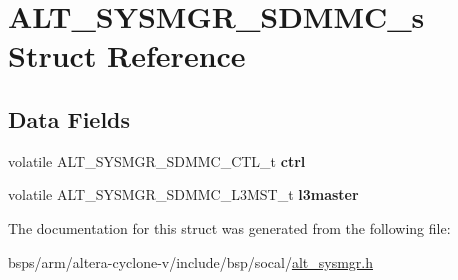 \hypertarget{structALT__SYSMGR__SDMMC__s}{}\section{A\+L\+T\+\_\+\+S\+Y\+S\+M\+G\+R\+\_\+\+S\+D\+M\+M\+C\+\_\+s Struct Reference}
\label{structALT__SYSMGR__SDMMC__s}
\subsection*{Data Fields}
\begin{DoxyCompactItemize}
\item 
\mbox{\label{structALT__SYSMGR__SDMMC__s_a8eb6036618c4d7fcfd26b771fd6a5080}} 
volatile A\+L\+T\+\_\+\+S\+Y\+S\+M\+G\+R\+\_\+\+S\+D\+M\+M\+C\+\_\+\+C\+T\+L\+\_\+t {\bfseries ctrl}
\item 
\mbox{\label{structALT__SYSMGR__SDMMC__s_a30eda050c5755d123460a5aff7b58b84}} 
volatile A\+L\+T\+\_\+\+S\+Y\+S\+M\+G\+R\+\_\+\+S\+D\+M\+M\+C\+\_\+\+L3\+M\+S\+T\+\_\+t {\bfseries l3master}
\end{DoxyCompactItemize}


The documentation for this struct was generated from the following file\+:\begin{DoxyCompactItemize}
\item 
bsps/arm/altera-\/cyclone-\/v/include/bsp/socal/\mbox{\hyperlink{alt__sysmgr_8h}{alt\+\_\+sysmgr.\+h}}\end{DoxyCompactItemize}
